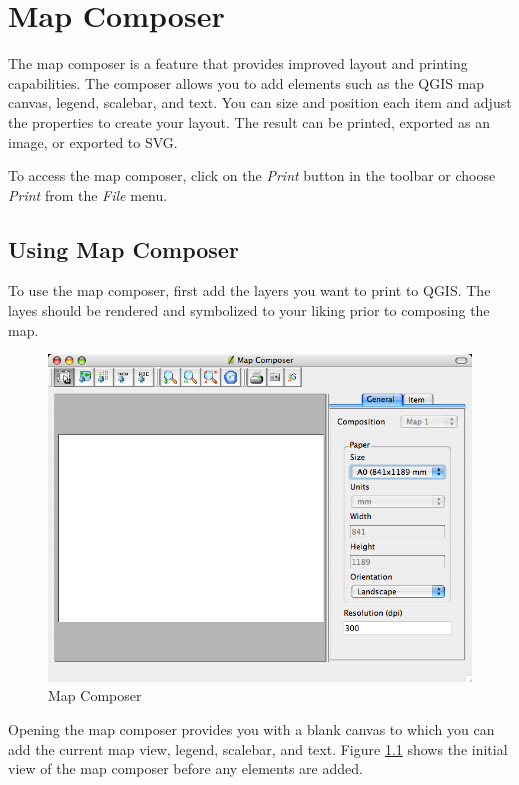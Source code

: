 \chapter{Map Composer}
The map composer is a feature that provides improved layout and printing
capabilities. The composer allows you to add elements such as the QGIS map
canvas, legend, scalebar, and text. You can size and position each item and
adjust the properties to create your layout. The result can be printed,
exported as an image, or exported to SVG.

To access the map composer, click on the \textit{Print} button in the toolbar
or choose \textit{Print} from the \textit{File} menu.

\section{Using Map Composer} To use the map composer, first add the layers you
want to print to QGIS. The layes should be rendered and symbolized to your
liking prior to composing the map. 
\begin{figure}[h]
   \begin{center}
   \caption{Map Composer}\label{fig:map_composer_blank}\smallskip
   \includegraphics[scale=.70]{qgis_user_guide_images/map_composer_blank}
\end{center}  
\end{figure}
Opening the map composer provides you with a blank canvas to which you can add
the current map view, legend, scalebar, and text. Figure
\ref{fig:map_composer_blank} shows the initial view of the map composer before
any elements are added.

